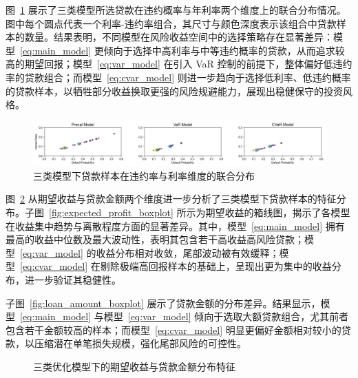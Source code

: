 \documentclass{write_paper}
\begin{document}
图~\ref{fig:combined_results} 展示了三类模型所选贷款在违约概率与年利率两个维度上的联合分布情况。图中每个圆点代表一个利率-违约率组合，其尺寸与颜色深度表示该组合中贷款样本的数量。结果表明，不同模型在风险收益空间中的选择策略存在显著差异：模型~\ref{eq:main_model} 更倾向于选择中高利率与中等违约概率的贷款，从而追求较高的期望回报；模型~\ref{eq:var_model} 在引入 VaR 控制的前提下，整体偏好低违约率的贷款组合；而模型~\ref{eq:cvar_model} 则进一步趋向于选择低利率、低违约概率的贷款样本，以牺牲部分收益换取更强的风险规避能力，展现出稳健保守的投资风格。

\begin{figure}[htbp]
\centering
\includegraphics[width=\textwidth]{Figures/model_comparison_scatter.png}
\caption{三类模型下贷款样本在违约率与利率维度的联合分布}
\label{fig:combined_results}
\end{figure}

图~\ref{fig:boxplot_comparison} 从期望收益与贷款金额两个维度进一步分析了三类模型下贷款样本的特征分布。子图~\ref{fig:expected_profit_boxplot} 所示为期望收益的箱线图，揭示了各模型在收益集中趋势与离散程度方面的显著差异。其中，模型~\ref{eq:main_model} 拥有最高的收益中位数及最大波动性，表明其包含若干高收益高风险贷款；模型~\ref{eq:var_model} 的收益分布相对收敛，尾部波动被有效缓释；模型~\ref{eq:cvar_model} 在剔除极端高回报样本的基础上，呈现出更为集中的收益分布，进一步验证其稳健性。

子图~\ref{fig:loan_amount_boxplot} 展示了贷款金额的分布差异。结果显示，模型~\ref{eq:main_model} 与模型~\ref{eq:var_model} 倾向于选取大额贷款组合，尤其前者包含若干金额较高的样本；而模型~\ref{eq:cvar_model} 明显更偏好金额相对较小的贷款，以压缩潜在单笔损失规模，强化尾部风险的可控性。

\begin{figure}[htbp]
\centering
{}
\caption{三类优化模型下的期望收益与贷款金额分布特征}
\label{fig:boxplot_comparison}
\end{figure}
\end{document}

